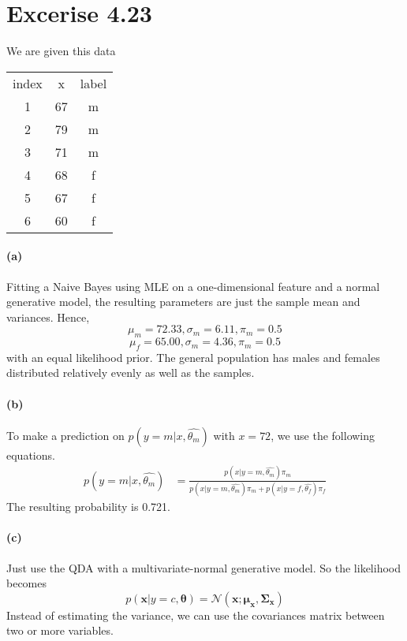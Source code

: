 \documentclass[12pt, letterpaper]{article}
\begin{document}
\section{Excerise 4.23}
We are given this data
\begin{center}
\begin{tabular}{ccc}
index & x  & label \\
1     & 67 & m     \\
2     & 79 & m     \\
3     & 71 & m     \\
4     & 68 & f     \\
5     & 67 & f     \\
6     & 60 & f    
\end{tabular}
\end{center}

\paragraph{(a)} Fitting a Naive Bayes using MLE on a one-dimensional feature and a normal generative model,
the resulting parameters are just the sample mean and variances. Hence,
\[
    \mu_m = 72.33, \sigma_m = 6.11, \pi_m = 0.5
\]
\[
    \mu_f = 65.00, \sigma_m = 4.36, \pi_m = 0.5
\]
with an equal likelihood prior. The general population has males and females distributed relatively evenly
as well as the samples.

\paragraph{(b)} To make a prediction on $p(y=m|x, \hat{\theta_m})$ with $x = 72$, we use the following equations.
\begin{align*}
    p(y=m|x, \hat{\theta_m}) &= \frac{p(x|y=m, \hat{\theta_m})\pi_m}{p(x|y=m, \hat{\theta_m})\pi_m + p(x|y=f, \hat{\theta_f})\pi_f}
\end{align*}
The resulting probability is 0.721.

\paragraph{(c)} Just use the QDA with a multivariate-normal generative model. So the likelihood becomes
\[
    p(\mathbf{x}|y=c, \mathbf{\theta}) = \mathcal{N}(\mathbf{x; \mu_x}, \mathbf{\Sigma_x})
\]
Instead of estimating the variance, we can use the covariances matrix between two or more variables.
\end{document}
